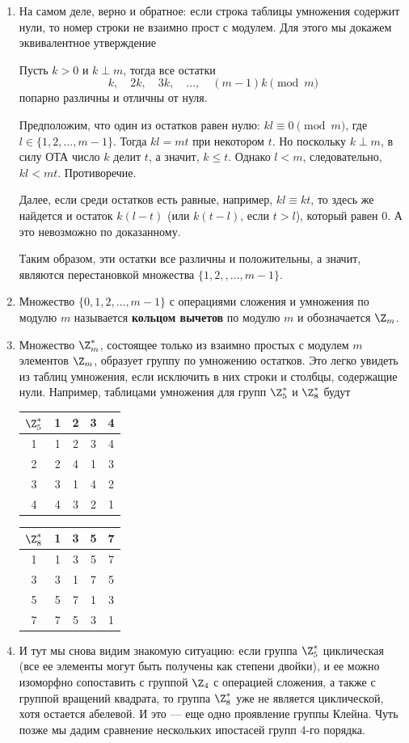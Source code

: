 \begin{enumerate}
\item На самом деле, верно и обратное: если строка таблицы умножения содержит нули, то номер строки не взаимно прост с модулем. Для этого мы докажем эквивалентное утверждение
\begin{thrm}\label{k2k3k}
Пусть $k>0$  и  $k\perp m$, тогда все остатки
$$
k,\quad 2k,\quad 3k,\quad\dots,\quad (m-1)k\pmod m
$$
попарно различны и отличны от нуля.
\end{thrm}
\pf Предположим, что один из остатков равен нулю: $kl\equiv 0\pmod m$, где $l\in\{1,2,\dots,m-1\}$. Тогда $kl=mt$ при некотором $t$. Но поскольку $k\perp m$, в силу ОТА число $k$ делит $t$, а значит, $k\le t$. Однако $l<m$, следовательно, $kl<mt$. Противоречие.

Далее, если среди остатков есть равные, например, $kl\equiv kt$, то здесь же найдется и остаток $k(l-t)$ (или $k(t-l)$, если $t>l$), который равен 0. А это невозможно по доказанному. 

Таким образом, эти остатки все различны и положительны, а значит, являются перестановкой множества $\{1,2,,\dots,m-1\}$.
\epf
\item Множество $\{0,1,2,\dots,m-1\}$ с операциями сложения и умножения по модулю $m$ называется \textbf{кольцом вычетов} по модулю $m$ и обозначается $\Z_m$.
\item Множество $\Z_m^*$, состоящее только из взаимно простых с модулем $m$ элементов $\Z_m$, образует группу по умножению остатков. Это легко увидеть из таблиц умножения, если исключить в них строки и столбцы, содержащие нули. Например, таблицами умножения для групп $\Z_5^*$ и $\Z_8^*$ будут
\begin{center}
\begin{tabular}{c||c|c|c|c|}
$\Z_5^*$  & 1 & 2 & 3 & 4 \\ \hline\hline
        1 & 1 & 2 & 3 & 4 \\ \hline
        2 & 2 & 4 & 1 & 3 \\ \hline
        3 & 3 & 1 & 4 & 2 \\ \hline
        4 & 4 & 3 & 2 & 1 \\ \hline
\end{tabular}
\qquad
\begin{tabular}{c||c|c|c|c|}
$\Z_8^*$  & 1 & 3 & 5 & 7 \\ \hline\hline
        1 & 1 & 3 & 5 & 7 \\ \hline
        3 & 3 & 1 & 7 & 5 \\ \hline
        5 & 5 & 7 & 1 & 3 \\ \hline
        7 & 7 & 5 & 3 & 1 \\ \hline
\end{tabular}
\end{center}
\item И тут мы снова видим знакомую ситуацию: если группа $\Z_5^*$ циклическая (все ее элементы могут быть получены как степени двойки), и ее можно изоморфно сопоставить с группой $\Z_4$ с операцией сложения, а также с группой вращений квадрата, то группа $\Z_8^*$ уже не является циклической, хотя остается абелевой. И это --- еще одно проявление группы Клейна. Чуть позже мы дадим сравнение нескольких ипостасей групп 4-го порядка.


\end{enumerate}
